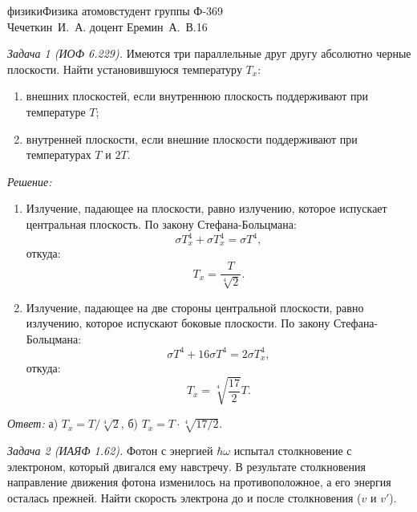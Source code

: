 




\renewcommand{\labelenumi}{\asbuk{enumi})}
\newcommand{\mr}[1]{\mathrm{#1}}


{физики}{Физика атомов}{студент группы Ф-369\\Чечеткин~И.~А.}
{доцент Еремин~А.~В.}{\!\!}{16}
\newpage

\emph{Задача 1 (ИОФ 6.229).}
Имеются три параллельные друг другу абсолютно черные плоскости.
Найти установившуюся температуру \( T_x \):
\vspace*{-.8em}
\begin{enumerate} \itemsep-.5em
    \item внешних плоскостей, если внутреннюю плоскость поддерживают при
    температуре \( T \);
    \item внутренней плоскости, если внешние плоскости поддерживают при
    температурах \( T \) и \( 2T \).
\end{enumerate}

\vspace*{2em}
\emph{Решение:}
\begin{enumerate}
    \item Излучение, падающее на плоскости, равно излучению, которое испускает
    центральная плоскость. По закону Стефана-Больцмана:
    \[
        \sigma T_x^4 + \sigma T_x^4 = \sigma T^4,
    \]
    откуда:
    \[
        T_x = \frac{T}{\sqrt[4]{2}}.
    \]
    \item Излучение, падающее на две стороны центральной плоскости, равно
    излучению, которое испускают боковые плоскости. По закону Стефана-Больцмана:
    \[
        \sigma T^4 + 16\sigma T^4 = 2\sigma T_x^4,
    \]
    откуда:
    \[
        T_x = \sqrt[4]{\frac{17}{2}}T.
    \]
\end{enumerate}
\vspace*{2em}        
\emph{Ответ:} а) \( T_x = T/\sqrt[4]{2} \), б) \( T_x = T\cdot\sqrt[4]{17/2} \). 
\newpage

\emph{Задача 2 (ИАЯФ 1.62).}
Фотон с энергией \( \hbar\omega \) испытал столкновение с электроном, который
двигался ему навстречу. В результате столкновения направление движения фотона
изменилось на противоположное, а его энергия осталась прежней. Найти скорость
электрона до и после столкновения (\( v \) и \( v' \)).

